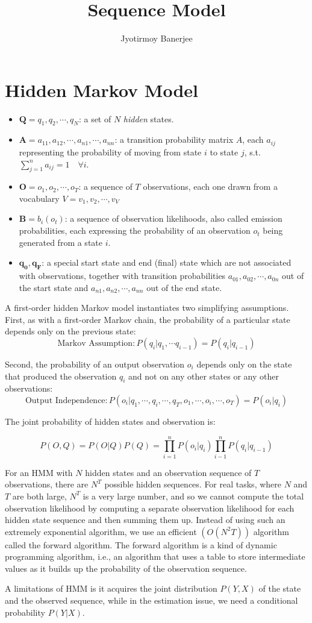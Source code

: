 \documentclass{article}
\title{Sequence Model}
\author{Jyotirmoy Banerjee}
\begin{document}
\maketitle

\section{Hidden Markov Model}

\begin{itemize}
\item $\mathbf{Q} = q_1,q_2, \cdots, q_N$: a set of $N$ \emph{hidden} states.
\item $\mathbf{A} = a_{11},a_{12}, \cdots, a_{n1}, \cdots, a_{nn}$: a transition probability matrix $A$, each $a_{ij}$ representing the probability of moving from state $i$ to state $j$, s.t.\ $\sum_{j=1}^{n}a_{ij} = 1 \quad  \forall i$.
\item $\mathbf{O} = o_1, o_2, \cdots, o_T$: a sequence of $T$ observations, each one drawn from a vocabulary $V = v_1, v_2, \cdots, v_V$
\item $\mathbf{B} = b_i(o_t)$: a sequence of observation likelihoods, also called emission probabilities, each expressing the probability of an observation $o_t$ being generated from a state $i$.
\item $\mathbf{q_0,q_F}$: a special start state and end (final) state which are not associated with observations, together with transition probabilities $a_{01},a_{02}, \cdots, a_{0n}$ out of the start state and $a_{n1},a_{n2}, \cdots, a_{nn}$ out of the end state.
\end{itemize}

A first-order hidden Markov model instantiates two simplifying assumptions.
First, as with a first-order Markov chain, the probability of a particular state depends
only on the previous state:
\[\text{Markov Assumption}:  P(q_i | q_1,\cdots q_{i-1}) = P(q_i | q_{i-1}) \]

Second, the probability of an output observation $o_i$ depends only on the state that
produced the observation $q_i$ and not on any other states or any other observations:
\[\text{Output Independence}: P(o_i|q_1,\cdots,q_i,\cdots,q_T,o_1,\cdots,o_i,\cdots,o_T) = P(o_i | q_i)\]

The joint probability of hidden states and observation is:

\[ P(O, Q) = P(O|Q) P(Q) = \prod_{i=1}^{n} P(o_i | q_i) \prod_{i-1}^{n} P(q_i | q_{i-1}) \]


For an HMM with $N$ hidden states and an observation sequence of $T$ observations, there are $N^T$ possible hidden sequences. For real tasks, where $N$ and $T$ are both large, $N^T$ is a very large number, and so we cannot compute the total observation likelihood by computing a separate observation likelihood for each hidden state sequence and then summing them up. Instead of using such an extremely exponential algorithm, we use an efficient $(O(N^2 T))$ algorithm called the forward algorithm. The forward algorithm is a kind of dynamic programming algorithm, i.e., an algorithm that uses a table to store intermediate values as it builds up the probability of the observation sequence.

A limitations of HMM is it acquires the joint distribution $P(Y, X)$ of the state and the observed sequence, while in the estimation issue, we need a conditional probability $P(Y|X)$.
\end{document}
